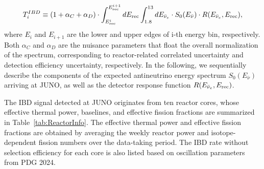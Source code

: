 \begin{equation}
    T_i^{IBD} \equiv (1+\alpha_C+\alpha_D)\cdot\int_{E^i_{\rm{rec}}}^{E^{i+1}_{\rm{rec}}}dE_{\rm{rec}}\int_{1.8}^{13} dE_{\bar{\nu}_e}\cdot S_0(E_{\bar{\nu}})\cdot R(E_{\bar{\nu}_e}, E_{\rm{rec}}),
    \label{eq:DetectorResponse:further}
\end{equation}
where $E_i$ and $E_{i+1}$ are the lower and upper edges of i-th energy bin, respectively. Both $\alpha_C$ and $\alpha_D$ are the nuisance parameters that float the overall normalization of the spectrum, corresponding to reactor-related correlated uncertainty and detection efficiency uncertainty, respectively. In the following, we sequentially describe the components of the expected antineutrino energy spectrum $S_0(E_{\bar{\nu}})$ arriving at JUNO, as well as the detector response function $R(E_{\bar{\nu}_e}, E_{\rm{rec}})$. 

The IBD signal detected at JUNO originates from ten reactor cores, whose effective thermal power, baselines, and effective fission fractions are summarized in Table~\ref{tab:ReactorInfo}. The effective thermal power and effective fission fractions are obtained by averaging the weekly reactor power and isotope-dependent fission numbers over the data-taking period. The IBD rate without selection efficiency for each core is also listed based on oscillation parameters from PDG 2024.


